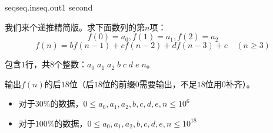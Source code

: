 \documentclass[11pt,a4paper,oneside]{article}
\begin{document}
\begin{problem}{seq}{seq.in}{seq.out}{1 second} 
	
	我们来个递推精简版。求下面数列的第$n$项：
	$$
		f(0) = a_0, f(1) = a_1, f(2) = a_2
	$$
	$$
		f(n) = bf(n-1) + cf(n-2) + df(n-3) + e \quad (n \geq 3)
	$$
	
	\InputFile
	包含$1$行，共$8$个整数：$ a_0 \; a_1 \; a_2 \; b \; c \; d \; e \; n $。
	
	\OutputFile
	输出$f(n)$的后$18$位（后$18$位的前缀$0$需要输出，不足$18$位用$0$补齐）。
	
	\Example
	
	\begin{example}
\end{example}

\Note

\begin{itemize}
	\item 对于$30\%$的数据，$ 0 \leq a_0, a_1, a_2, b, c, d, e, n \leq 10^{6}$
	\item 对于$100\%$的数据，$ 0 \leq a_0, a_1, a_2, b, c, d, e, n \leq 10^{18}$
\end{itemize}

\end{problem}
\end{document}

